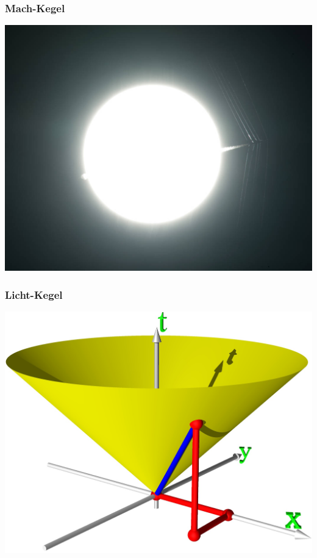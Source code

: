 \begin{frame}
\frametitle{Mach-Kegel}
\begin{center}
\includegraphics[width=\hsize]{afrc.jpg}
\end{center}
\end{frame}

\begin{frame}
\frametitle{Licht-Kegel}
\begin{center}
\includegraphics[width=\hsize]{lichtkegel.jpg}
\end{center}
\end{frame}

